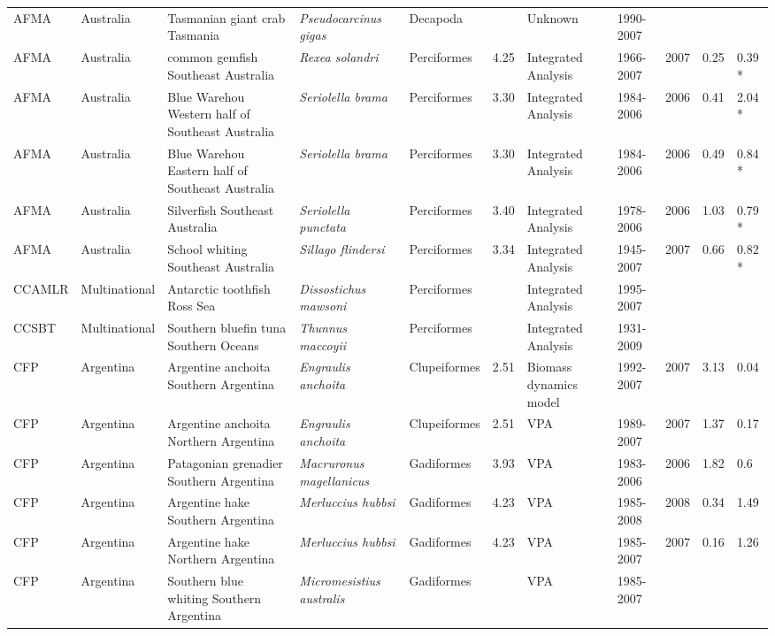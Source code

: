 \begin{longtable}{p{1.5cm}p{1.5cm}p{3cm}p{3cm}p{2.5cm}p{0.9cm}p{1.4cm}p{0.9cm}p{0.9cm}p{0.9cm}p{1cm}}
  AFMA & Australia & Tasmanian giant crab Tasmania & \textit{Pseudocarcinus gigas} & Decapoda &  & Unknown & 1990-2007 &  &  &  \\ 
  AFMA & Australia & common gemfish Southeast Australia & \textit{Rexea solandri} & Perciformes & 4.25 & Integrated Analysis & 1966-2007 & 2007 & 0.25 & 0.39 * \\ 
  AFMA & Australia & Blue Warehou Western half of Southeast Australia & \textit{Seriolella brama} & Perciformes & 3.30 & Integrated Analysis & 1984-2006 & 2006 & 0.41 & 2.04 * \\ 
  AFMA & Australia & Blue Warehou Eastern half of Southeast Australia & \textit{Seriolella brama} & Perciformes & 3.30 & Integrated Analysis & 1984-2006 & 2006 & 0.49 & 0.84 * \\ 
  AFMA & Australia & Silverfish Southeast Australia & \textit{Seriolella punctata} & Perciformes & 3.40 & Integrated Analysis & 1978-2006 & 2006 & 1.03 & 0.79 * \\ 
  AFMA & Australia & School whiting Southeast Australia & \textit{Sillago flindersi} & Perciformes & 3.34 & Integrated Analysis & 1945-2007 & 2007 & 0.66 & 0.82 * \\ 
  CCAMLR & Multinational & Antarctic toothfish Ross Sea & \textit{Dissostichus mawsoni} & Perciformes &  & Integrated Analysis & 1995-2007 &  &  &  \\ 
  CCSBT & Multinational & Southern bluefin tuna Southern Oceans & \textit{Thunnus maccoyii} & Perciformes &  & Integrated Analysis & 1931-2009 &  &  &  \\ 
  CFP & Argentina & Argentine anchoita Southern Argentina & \textit{Engraulis anchoita} & Clupeiformes & 2.51 & Biomass dynamics model & 1992-2007 & 2007 & 3.13 & 0.04 \\ 
  CFP & Argentina & Argentine anchoita Northern Argentina & \textit{Engraulis anchoita} & Clupeiformes & 2.51 & VPA & 1989-2007 & 2007 & 1.37 & 0.17 \\ 
  CFP & Argentina & Patagonian grenadier Southern Argentina & \textit{Macruronus magellanicus} & Gadiformes & 3.93 & VPA & 1983-2006 & 2006 & 1.82 & 0.6 \\ 
  CFP & Argentina & Argentine hake Southern Argentina & \textit{Merluccius hubbsi} & Gadiformes & 4.23 & VPA & 1985-2008 & 2008 & 0.34 & 1.49 \\ 
  CFP & Argentina & Argentine hake Northern Argentina & \textit{Merluccius hubbsi} & Gadiformes & 4.23 & VPA & 1985-2007 & 2007 & 0.16 & 1.26 \\ 
  CFP & Argentina &  Southern blue whiting Southern Argentina & \textit{Micromesistius australis} & Gadiformes &  & VPA & 1985-2007 &  &  &  \\ 

\end{longtable}
